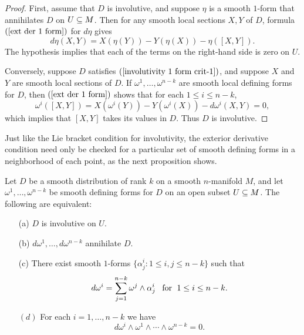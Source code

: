 \begin{proof}
First, assume that $D$ is involutive, and suppose $\eta$ is a smooth $1$-form that annihilates $D$ on $U\subseteq M$. Then for any smooth local sections $X,Y$ of $D$, formula $(\ref{ext der 1 form})$ for $d\eta$ gives
\[d\eta(X,Y)=X(\eta(Y))-Y(\eta(X))-\eta([X,Y]).\]
The hypothesis implies that each of the terms on the right-hand side is zero on $U$.\par
Conversely, suppose $D$ satisfies $(\ref{involutivity 1 form crit-1})$, and suppose $X$ and $Y$ are smooth local
sections of $D$. If $\omega^1,\dots,\omega^{n-k}$ are smooth local defining forms for $D$, then $(\ref{ext der 1 form})$ shows that for each $1\leq i\leq n-k$,
\[\omega^i([X,Y])=X(\omega^i(Y))-Y(\omega^i(X))-d\omega^i(X,Y)=0,\]
which implies that $[X,Y]$ takes its values in $D$. Thus $D$ is involutive.
\end{proof}
Just like the Lie bracket condition for involutivity, the exterior derivative condition need only be checked for a particular set of smooth defining forms in a neighborhood of each point, as the next proposition shows.
\begin{proposition}\label{involutivity local coframe crit}
Let $D$ be a smooth distribution of rank $k$ on a smooth $n$-manifold $M$, and let $\omega^1,\dots,\omega^{n-k}$ be smooth defining forms for $D$ on an open subset $U\subseteq M$. The following are equivalent:
\begin{itemize}
\item[(a)] $D$ is involutive on $U$.
\item[(b)] $d\omega^1,\dots,d\omega^{n-k}$ annihilate $D$.
\item[(c)] There exist smooth $1$-forms $\{\alpha^i_j:1\leq i,j\leq n-k\}$ such that
\[d\omega^i=\sum_{j=1}^{n-k}\omega^j\wedge\alpha^i_j\hspace{8pt}\text{for}\hspace{6pt} 1\leq i\leq n-k.\]
\item[$(d)$] For each $i=1,\dots,n-k$ we have
\[d\omega^i\wedge\omega^1\wedge\cdots\wedge\omega^{n-k}=0.\] 
\end{itemize}
\end{proposition}
